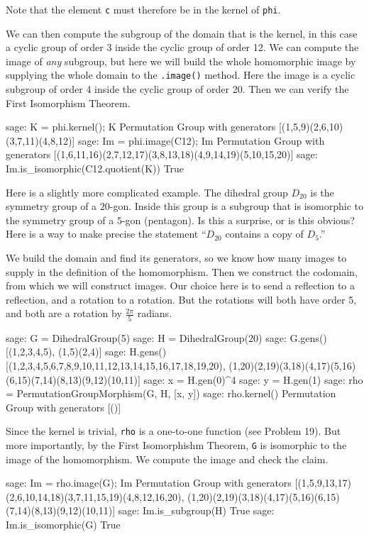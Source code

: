 %
Note that the element \verb?c? must therefore be in the kernel of \verb?phi?.\par
%
We can then compute the subgroup of the domain that is the kernel, in this case a cyclic group of order 3 inside the cyclic group of order 12.  We can compute the image of \emph{any} subgroup, but here we will build the whole homomorphic image by supplying the whole domain to the \verb?.image()? method.  Here the image is a cyclic subgroup of order 4 inside the cyclic group of order 20.  Then we can verify the First Isomorphism Theorem.
%
\begin{sageexample}
sage: K = phi.kernel(); K
Permutation Group with generators [(1,5,9)(2,6,10)(3,7,11)(4,8,12)]
sage: Im = phi.image(C12); Im
Permutation Group with generators
[(1,6,11,16)(2,7,12,17)(3,8,13,18)(4,9,14,19)(5,10,15,20)]
sage: Im.is_isomorphic(C12.quotient(K))
True
\end{sageexample}
%
Here is a slightly more complicated example.  The dihedral group $D_{20}$ is the symmetry group of a $20$-gon.  Inside this group is a subgroup that is isomorphic to the symmetry group of a $5$-gon (pentagon).  Is this a surprise, or is this obvious?  Here is a way to make precise the statement ``$D_{20}$ contains a copy of $D_{5}$.''\par
%
We build the domain and find its generators, so we know how many images to supply in the definition of the homomorphism.  Then we construct the codomain, from which we will construct images.  Our choice here is to send a reflection to a reflection, and a rotation to a rotation.  But the rotations will both have order 5, and both are a rotation by $\frac{2\pi}{5}$ radians.
%
\begin{sageexample}
sage: G = DihedralGroup(5)
sage: H = DihedralGroup(20)
sage: G.gens()
[(1,2,3,4,5), (1,5)(2,4)]
sage: H.gens()
[(1,2,3,4,5,6,7,8,9,10,11,12,13,14,15,16,17,18,19,20),
 (1,20)(2,19)(3,18)(4,17)(5,16)(6,15)(7,14)(8,13)(9,12)(10,11)]
sage: x = H.gen(0)^4
sage: y = H.gen(1)
sage: rho = PermutationGroupMorphism(G, H, [x, y])
sage: rho.kernel()
Permutation Group with generators [()]
\end{sageexample}
%
Since the kernel is trivial, \verb?rho? is a one-to-one function (see Problem 19).  But more importantly, by the First Isomorphishm Theorem, \verb?G? is isomorphic to the image of the homomorphism.  We compute the image and check the claim.
%
\begin{sageexample}
sage: Im = rho.image(G); Im
Permutation Group with generators
[(1,5,9,13,17)(2,6,10,14,18)(3,7,11,15,19)(4,8,12,16,20),
 (1,20)(2,19)(3,18)(4,17)(5,16)(6,15)(7,14)(8,13)(9,12)(10,11)]
sage: Im.is_subgroup(H)
True
sage: Im.is_isomorphic(G)
True
\end{sageexample}
